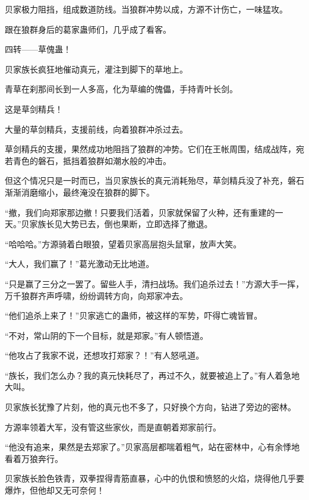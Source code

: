 \begin{this_body}
贝家极力阻挡，组成数道防线。当狼群冲势以成，方源不计伤亡，一味猛攻。

跟在狼群身后的葛家蛊师们，几乎成了看客。

四转——草傀蛊！

贝家族长疯狂地催动真元，灌注到脚下的草地上。

青草在刹那间长到一人多高，化为草编的傀儡，手持青叶长剑。

这是草剑精兵！

大量的草剑精兵，支援前线，向着狼群冲杀过去。

草剑精兵的支援，果然成功地阻挡了狼群的冲势。它们在王帐周围，结成战阵，宛若青色的磐石，抵挡着狼群如潮水般的冲击。

但这个情况只是一时而已，当贝家族长的真元消耗殆尽，草剑精兵没了补充，磐石渐渐消磨缩小，最终淹没在狼群的脚下。

“撤，我们向郑家那边撤！只要我们活着，贝家就保留了火种，还有重建的一天。”贝家族长见大势已去，倒也果断，立即选择了撤退。

“哈哈哈。”方源骑着白眼狼，望着贝家高层抱头鼠窜，放声大笑。

“大人，我们赢了！”葛光激动无比地道。

“只是赢了三分之一罢了。留些人手，清扫战场。我们追杀过去！”方源大手一挥，万千狼群齐声呼啸，纷纷调转方向，向郑家冲去。

“他们追杀上来了！”贝家逃亡的蛊师，被这样的军势，吓得亡魂皆冒。

“不对，常山阴的下一个目标，就是郑家。”有人顿悟道。

“他攻占了我家不说，还想攻打郑家？！”有人怒吼道。

“族长，我们怎么办？我的真元快耗尽了，再过不久，就要被追上了。”有人着急地大叫。

贝家族长犹豫了片刻，他的真元也不多了，只好换个方向，钻进了旁边的密林。

方源率领着大军，没有管这些家伙，而是直朝着郑家前行。

“他没有追来，果然是去郑家了。”贝家高层都喘着粗气，站在密林中，心有余悸地看着万狼奔行。

贝家族长脸色铁青，双拳捏得青筋直暴，心中的仇恨和愤怒的火焰，烧得他几乎要爆炸，但他却又无可奈何！

\end{this_body}

